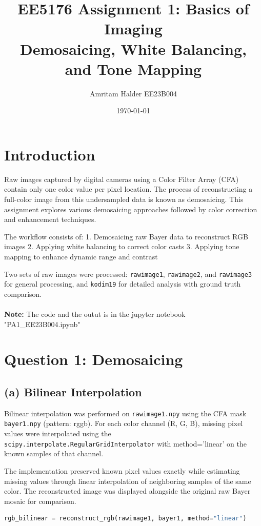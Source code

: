 \documentclass[12pt,a4paper]{article}
\title{EE5176 Assignment 1: Basics of Imaging\\Demosaicing, White Balancing, and Tone Mapping}
\author{Amritam Halder EE23B004}
\date{\today}
\begin{document}
\maketitle

\section{Introduction}
Raw images captured by digital cameras using a Color Filter Array (CFA) contain only one color value per pixel location. The process of reconstructing a full-color image from this undersampled data is known as demosaicing. This assignment explores various demosaicing approaches followed by color correction and enhancement techniques.

The workflow consists of:
1. Demosaicing raw Bayer data to reconstruct RGB images
2. Applying white balancing to correct color casts
3. Applying tone mapping to enhance dynamic range and contrast

Two sets of raw images were processed: \texttt{rawimage1}, \texttt{rawimage2}, and \texttt{rawimage3} for general processing, and \texttt{kodim19} for detailed analysis with ground truth comparison.
\\
\\
\textbf{Note:} The code and the outut is in the jupyter notebook "PA1\_EE23B004.ipynb"
\section{Question 1: Demosaicing}

\subsection{(a) Bilinear Interpolation}
Bilinear interpolation was performed on \texttt{rawimage1.npy} using the CFA mask \texttt{bayer1.npy} (pattern: rggb). For each color channel (R, G, B), missing pixel values were interpolated using the \texttt{scipy.interpolate.RegularGridInterpolator} with method='linear' on the known samples of that channel.

The implementation preserved known pixel values exactly while estimating missing values through linear interpolation of neighboring samples of the same color. The reconstructed image was displayed alongside the original raw Bayer mosaic for comparison.

\vspace{0.5cm}
\begin{lstlisting}[language=python]
rgb_bilinear = reconstruct_rgb(rawimage1, bayer1, method="linear")
\end{lstlisting}
\end{document}
